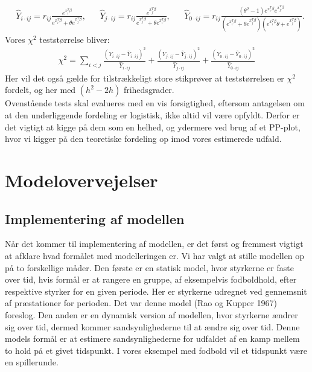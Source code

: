 \documentclass[11pt,a4paper]{article}
\begin{document}
\begin{align*}
&\hat{Y}_{i\cdot ij} = r_{ij}\frac{e^{x_i^T\beta}}{e^{x_i^T\beta}+\theta e^{x_j^T\beta}},
&&\hat{Y}_{j\cdot ij} = r_{ij}\frac{e^{x_j^T\beta}}{e^{x_j^T\beta}+\theta e^{x_i^T\beta}},
&&\hat{Y}_{0\cdot ij} = r_{ij}\frac{(\theta^2-1)e^{x_i^T\beta}e^{x_j^T\beta}}{(e^{x_i^T\beta}+\theta e^{x_j^T\beta})(e^{x_i^T\beta}\theta +e^{x_j^T\beta})}.
\end{align*}
Vores $\chi^2$ teststørrelse bliver:
\begin{align*}
\chi^2 = \sum_{i<j} \frac{(Y_{i\cdot ij}-\hat{Y}_{i\cdot ij})^2}{\hat{Y}_{i\cdot ij}} + \frac{(Y_{j\cdot ij}-\hat{Y}_{j\cdot ij})^2}{\hat{Y}_{j\cdot ij}} + \frac{(Y_{0\cdot ij}-\hat{Y}_{0\cdot ij})^2}{\hat{Y}_{0\cdot ij}}
\end{align*}
Her vil det også gælde for tilstrækkeligt store stikprøver at teststørrelsen er $\chi^2$ fordelt, og her med $(h^2-2h)$ frihedsgrader. \\
Ovenstående tests skal evalueres med en vis forsigtighed, eftersom antagelsen om at den underliggende fordeling er logistisk, ikke altid vil være opfyldt. Derfor er det vigtigt at kigge på dem som en helhed, og ydermere ved brug af et PP-plot, hvor vi kigger på den teoretiske fordeling op imod vores estimerede udfald. 

\section{Modelovervejelser}
\subsection{Implementering af modellen}
Når det kommer til implementering af modellen, er det først og fremmest vigtigt at afklare hvad formålet med modelleringen er. Vi har valgt at stille modellen op på to forskellige måder. Den første er en statisk model, hvor styrkerne er faste over tid, hvis formål er at rangere en gruppe, af eksempelvis fodboldhold, efter respektive styrker for en given periode. Her er styrkerne udregnet ved gennemsnit af præstationer for perioden. Det var denne model (Rao og Kupper 1967) foreslog. Den anden er en dynamisk version af modellen, hvor styrkerne ændrer sig over tid, dermed kommer sandsynlighederne til at ændre sig over tid. Denne models formål er at estimere sandsynlighederne for udfaldet af en kamp mellem to hold på et givet tidspunkt. I vores eksempel med fodbold vil et tidspunkt være en spillerunde. 
\end{document}
